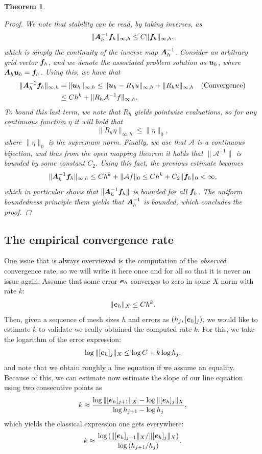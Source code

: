 \documentclass{article}
\renewcommand{\vec}{\vectorsym}
\newcommand{\mat}{\matrixsym}
\newtheorem{theorem}{Theorem}
\begin{document}
\begin{theorem}
\begin{proof}
        We note that stability can be read, by taking inverses, as 
        $$ \| \mat A_h^{-1}\vec f_h \|_{\infty, h} \leq C \|\vec f_h\|_{\infty, h}. $$
        which is simply the continuity of the inverse map $\mat A_h^{-1}$. Consider an arbitrary grid vector $\vec f_h$, and we denote the associated problem solution as $\vec u_h$, where $\mat A_h \vec u_h = \vec f_h$. Using this, we have that
        $$ 
        \begin{aligned} 
            \|\mat A_h^{-1}\vec f_h\|_{\infty,h} &= \| \vec u_h \|_{\infty, h} \leq \| \vec u_h - R_h u \|_{\infty, h} + \| R_h u \|_{\infty, h} && \text{(Convergence)}\\
                                                 &\leq C h^k + \| R_h \mathcal A^{-1} f \|_{\infty, h}. 
        \end{aligned}
        $$
        To bound this last term, we note that $R_h$ yields pointwise evaluations, so for any continuous function $\eta$ it will hold that
        $$ \| R_h \eta \|_{\infty,h} \leq \| \eta \|_0, $$
        where $\| \eta \|_0$ is the supremum norm. Finally, we use that $\mathcal A$ is a continuous bijection, and thus from the open mapping theorem it holds that $\|\mathcal A^{-1}\|$ is bounded by some constant $C_2$. Using this fact, the previous estimate becomes 
        $$ \| \mat A_h^{-1} \vec f_h \|_{\infty,h} \leq Ch^k + \| \mathcal A f \|_0 \leq C h^k + C_2 \| \vec f_h \|_0<\infty, $$
        which in particular shows that $ \| \mat A_h^{-1} \vec f_h \|$ is bounded for all $\vec f_h$. The uniform boundedness principle them yields that $\mat A_h^{-1}$ is bounded, which concludes the proof.
    \end{proof}
\end{theorem}
\subsection{The empirical convergence rate}
One issue that is always overviewed is the computation of the \emph{observed} convergence rate, so we will write it here once and for all so that it is never an issue again. Assume that some error $\vec e_h$ converges to zero in some $X$ norm with rate $k$:
    $$ \|\vec e_h\|_X \leq C h^k.$$
    Then, given a sequence of mesh sizes $h$ and errors as $(h_j, [\vec e_h]_j)$, we would like to estimate $k$ to validate we really obtained the computed rate $k$. For this, we take the logarithm of the error expression:
    $$ \log \|[\vec e_h]_j\|_X \leq \log C + k \log h_j, $$
and note that we obtain roughly a line equation if we assume an equality. Because of this, we can estimate now estimate the slope of our line equation using two consecutive points as
$$ k \approx \frac{\log \|[\vec e_h]_{j+1}\|_X - \log \|[\vec e_h]_j\|_X}{ \log h_{j+1} - \log h_j}, $$
which yields the classical expression one gets everywhere: 
    $$ k \approx  \frac{\log \left(\|[\vec e_h]_{j+1}\|_X / \|[\vec e_h]_j\|_X\right)}{ \log \left(h_{j+1} / h_j\right)}. $$
\end{document}
